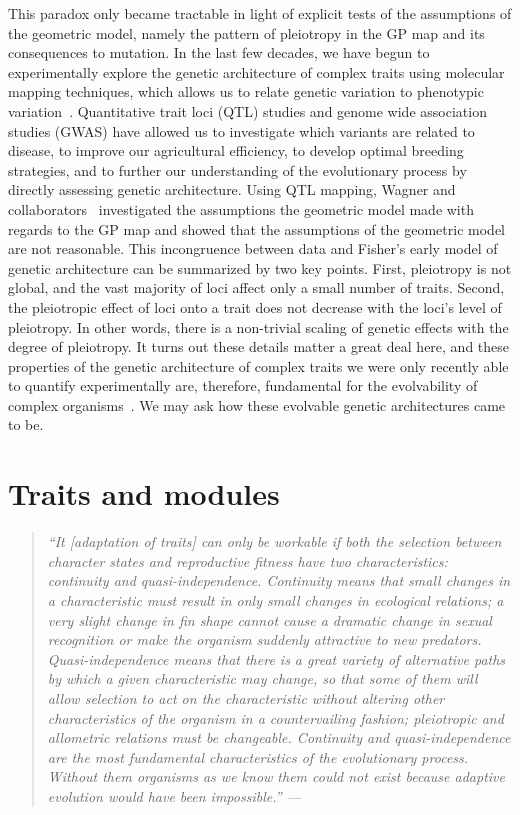 \begin{refsection}
This paradox only became tractable in light of explicit tests of the
assumptions of the geometric model, namely the pattern of pleiotropy in
the GP map and its consequences to mutation. In the last few decades, we
have begun to experimentally explore the genetic architecture of complex
traits using molecular mapping techniques, which allows us to relate
genetic variation to phenotypic variation~\parencite{Mackay2001-mk}.
Quantitative trait loci (QTL) studies and genome wide association
studies (GWAS) have allowed us to investigate which variants are related
to disease, to improve our agricultural efficiency, to develop optimal
breeding strategies, and to further our understanding of the
evolutionary process by directly assessing genetic architecture. Using
QTL mapping, Wagner and collaborators~\parencite*{Wagner2008-oz} investigated
the assumptions the geometric model made with regards to the GP map and
showed that the assumptions of the geometric model are not reasonable.
This incongruence between data and Fisher's early model of genetic
architecture can be summarized by two key points. First, pleiotropy is
not global, and the vast majority of loci affect only a small number of
traits. Second, the pleiotropic effect of loci onto a trait does not
decrease with the loci's level of pleiotropy. In other words, there is a
non-trivial scaling of genetic effects with the degree of pleiotropy. It
turns out these details matter a great deal here, and these properties
of the genetic architecture of complex traits we were only recently able
to quantify experimentally are, therefore, fundamental for the
evolvability of complex organisms~\parencite{Wagner2011-kp}. We may ask how
these evolvable genetic architectures came to be.

\section{Traits and modules}

\begin{quote}
\textit{
``It {[}adaptation of traits{]} can only be workable if both the
selection between character states and reproductive fitness have two
characteristics: continuity and quasi-independence. Continuity means
that small changes in a characteristic must result in only small changes
in ecological relations; a very slight change in fin shape cannot cause
a dramatic change in sexual recognition or make the organism suddenly
attractive to new predators. Quasi-independence means that there is a
great variety of alternative paths by which a given characteristic may
change, so that some of them will allow selection to act on the
characteristic without altering other characteristics of the organism in
a countervailing fashion; pleiotropic and allometric relations must be
changeable. Continuity and quasi-independence are the most fundamental
characteristics of the evolutionary process. Without them organisms as
we know them could not exist because adaptive evolution would have been
impossible.'' --- \textcite{Lewontin1979-iw}}
\end{quote}


\end{refsection}
